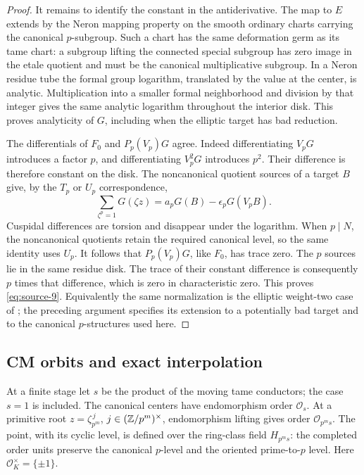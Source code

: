 \begin{proof}
It remains to identify the constant in the antiderivative.
The map to \(E\) extends by the Neron mapping property on the smooth
ordinary charts carrying the canonical \(p\)-subgroup.  Such a chart
has the same deformation germ as its tame chart: a subgroup lifting
the connected special subgroup has zero image in the etale quotient
and must be the canonical multiplicative subgroup.  In a Neron
residue tube the formal group logarithm, translated by the value at
the center, is analytic.  Multiplication into a smaller formal
neighborhood and division by that integer gives the same analytic
logarithm throughout the interior disk.  This proves analyticity of
\(G\), including when the elliptic target has bad reduction.

The differentials of \(F_0\) and \(P_p(V_p)G\) agree.  Indeed
differentiating \(V_pG\) introduces a factor \(p\), and
differentiating \(V_p^2G\) introduces \(p^2\).  Their difference is
therefore constant on the disk.  The noncanonical quotient sources
of a target \(B\) give, by the \(T_p\) or \(U_p\) correspondence,
\[
 \sum_{\zeta^p=1}G(\zeta z)
       =a_pG(B)-\epsilon_pG(V_pB).
\]
Cuspidal differences are torsion \cite{Manin,ManinDrinfeld} and
disappear under the logarithm.
When \(p\mid N\), the noncanonical quotients retain the required
canonical level, so the same identity uses \(U_p\).
It follows that \(P_p(V_p)G\), like \(F_0\), has trace zero.
The \(p\) sources lie in the same residue disk.  The trace of their
constant difference is consequently \(p\) times that difference,
which is zero in characteristic zero.  This proves
\eqref{eq:source-9}.  Equivalently the same normalization is the
elliptic weight-two case of \cite[Section~5, \emph{Raw toric periods
and the inverse Katz derivative}]{C}; the preceding argument specifies its
extension to a potentially bad target and to the canonical
\(p\)-structures used here.
\end{proof}

\subsection{CM orbits and exact interpolation}

At a finite stage let \(s\) be the product of the moving tame
conductors; the case \(s=1\) is included.  The canonical centers have
endomorphism order \(\mathcal O_s\).  At a primitive root
\(z=\zeta_{p^m}^{\,j}\), \(j\in(\mathbb Z/p^m)^\times\), endomorphism
lifting gives order \(\mathcal O_{p^ms}\).  The point, with its cyclic
level, is defined over the ring-class field \(H_{p^ms}\):
the completed order units preserve the canonical \(p\)-level and
the oriented prime-to-\(p\) level.  Here \(\mathcal O_K^\times=\{\pm1\}\).

